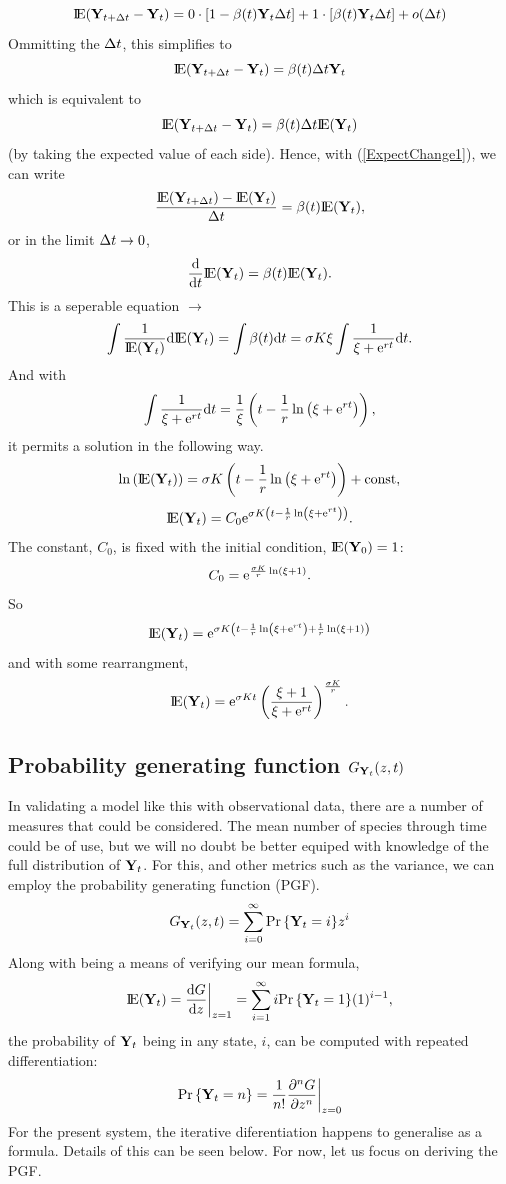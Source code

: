 $$ {\rm I}\!{\rm E}({\bf Y}_{t+\Delta t} - {\bf Y}_t) = 0 \cdot \left[1 -  \beta(t){{\bf Y}_t}\Delta t\right] + 1\cdot \left[\beta(t){{\bf Y}_t}\Delta t\right] + o(\Delta t)$$
Ommitting the $\Delta t$, this simplifies to
$$ {\rm I}\!{\rm E}({\bf Y}_{t+\Delta t} - {\bf Y}_t) =  {\beta(t)\Delta t{{\bf Y}_t}} $$
which is equivalent to 
$$ {\rm I}\!{\rm E}({\bf Y}_{t+\Delta t} - {\bf Y}_t) =  {\beta(t)\Delta t{\rm I}\!{\rm E}({{\bf Y}_t})}$$
(by taking the expected value of each side). Hence, with (\ref{ExpectChange1}), we can write
$$\frac{{\rm I}\!{\rm E}({\bf Y}_{t+\Delta t}) -  {\rm I}\!{\rm E}({{\bf Y}_t})}{\Delta t} =    {\beta(t){\rm I}\!{\rm E}({{\bf Y}_t})},$$
or in the limit $\Delta t \to 0$,
$$\displaystyle\frac{{\rm d} }{{\rm d} t} {\rm I}\!{\rm E}({\bf Y}_t) = \beta(t) {\rm I}\!{\rm E}({{\bf Y}_t}).$$
This is a seperable equation $\to$
$$\int\frac{1}{{\rm I}\!{\rm E}({{\bf Y}_t})}{\rm d} {\rm I}\!{\rm E}({{\bf Y}_t})  = \int \beta(t) {\rm d} t =  \sigma K \xi \int \frac{1}{\xi + {\rm e}^{rt}} {\rm d} t.$$
And with 
\begin{equation}
\label{intBetaT}
\int \frac{1}{\xi + {\rm e}^{rt}} {\rm d} t =\frac{1}{\xi} \left( t - \frac{1}{r} \ln\left(\xi + {\rm e}^{rt}\right) \right),
\end{equation}
it permits a solution in the following way.
$$\ln\left({\rm I}\!{\rm E}({{\bf Y}_t})\right) =  \sigma K\left( t - \frac{1}{r} \ln\left(\xi + {\rm e}^{rt}\right) \right)  + \text{const},$$
$${\rm I}\!{\rm E}({{\bf Y}_t}) = C_0 {\rm e}^{\sigma K\left( t - \frac{1}{r} \ln\left(\xi + {\rm e}^{rt}\right) \right) }.$$
The constant, $C_0$, is fixed with the initial condition, ${\rm I}\!{\rm E}({\bf Y}_0) = 1$:
$$C_0 = {\rm e}^{\frac{\sigma K}{r} \ln\left( \xi+1\right)}.$$
So
$${\rm I}\!{\rm E}({{\bf Y}_t}) = {\rm e}^{\sigma K \left( t - \frac{1}{r} \ln\left(\xi + {\rm e}^{rt}\right) +\frac{1}{r}\ln\left(\xi + 1\right) \right)}$$
and with some rearrangment, 
$${\rm I}\!{\rm E}({{\bf Y}_t}) =  {\rm e}^{\sigma K t} \left(\frac{\xi + 1}{\xi + {\rm e}^{rt}}\right)^{\frac{\sigma K}{r}}.$$ 



\subsection{Probability generating function $G_{{{\bf Y}_t}}(z, t)$}

In validating a model like this with observational data, there are a number of measures that could be considered. The mean number of species through time could be of use, but we will no doubt be better equiped with knowledge of the full distribution of ${{\bf Y}_t}$. For this, and other metrics such as the variance, we can employ the probability generating function (PGF).
$$G_{{{\bf Y}_t}}(z,t) = \sum^{\infty}_{i=0} {\text{Pr}\left\{{{\bf Y}_t} = i\right\}} z^i $$
Along with being a means of verifying our mean formula,
$${\rm I}\!{\rm E}({{\bf Y}_t}) = \displaystyle\frac{{\rm d} G}{{\rm d} z}\bigg|_{z=1} = \sum_{i=1}^{\infty} i {\text{Pr}\left\{{{\bf Y}_t} = 1\right\}} (1)^{i-1},$$
the probability of ${{\bf Y}_t}$ being in any state, $i$, can be computed with repeated differentiation:
\begin{equation}
\label{diston}
{\text{Pr}\left\{{{\bf Y}_t}= n\right\}} = \frac{1}{n!}\frac{\partial^n G}{\partial z^n}\bigg|_{z= 0}
\end{equation}
For the present system, the iterative diferentiation happens to generalise as a formula. Details of this can be seen below. For now, let us focus on deriving the PGF.

